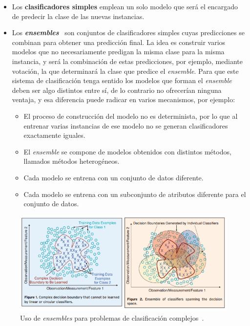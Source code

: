 \begin{itemize}
	\item Los \textbf{clasificadores simples} emplean un solo modelo que será el encargado de predecir la clase de las nuevas instancias. 
	\item Los \textbf{\textit{ensembles}}~\cite{kuncheva2004combining} son conjuntos de clasificadores simples cuyas predicciones se combinan para obtener una predicción final. La idea es construir varios modelos que no necesariamente predigan la misma clase para la misma instancia, y será la combinación de estas predicciones, por ejemplo, mediante votación, la que determinará la clase que predice el \textit{ensemble}. Para que este sistema de clasificación tenga sentido los modelos que forman el \textit{ensemble} deben ser algo distintos entre sí, de lo contrario no ofrecerían ninguna ventaja, y esa diferencia puede radicar en varios mecanismos, por ejemplo: 
	\begin{itemize}
		\item El proceso de construcción del modelo no es determinista, por lo que al entrenar varias instancias de ese modelo no se generan clasificadores exactamente iguales. 
		\item El \textit{ensemble} se compone de modelos obtenidos con distintos métodos, llamados métodos heterogéneos. 
		\item Cada modelo se entrena con un conjunto de datos diferente.
		\item Cada modelo se entrena con un subconjunto de atributos diferente para el conjunto de datos. 
	\end{itemize} 
\end{itemize} 

\begin{figure}[H]
	\centering
	\includegraphics[width=1\textwidth]{../img/ensembles.png}
	\caption[Uso de \textit{ensembles} para problemas de clasificación complejos.]{Uso de \textit{ensembles} para problemas de clasificación complejos~\cite{polikar2006ensemble}.}
	\label{fig:ensemble}
\end{figure}

